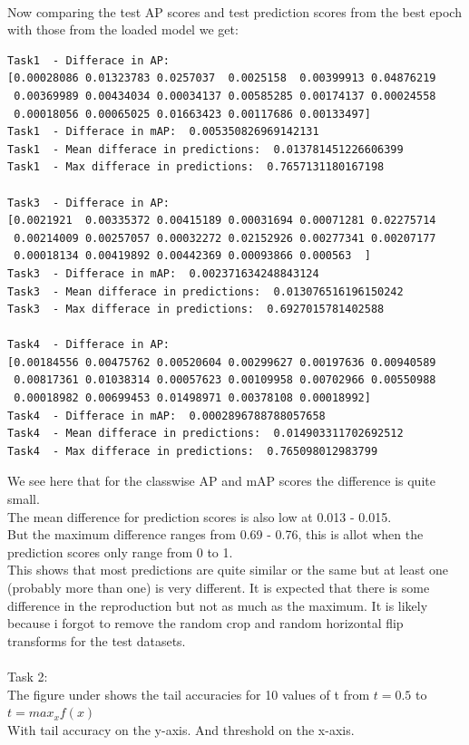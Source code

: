 \documentclass[12pt, letterpaper, twoside]{article}
\begin{document}
\newpage
\ \\
Now comparing the test AP scores and test prediction scores from the best epoch with those from the loaded model we get:\\
\begin{verbatim}
Task1  - Differace in AP:  
[0.00028086 0.01323783 0.0257037  0.0025158  0.00399913 0.04876219
 0.00369989 0.00434034 0.00034137 0.00585285 0.00174137 0.00024558
 0.00018056 0.00065025 0.01663423 0.00117686 0.00133497]
Task1  - Differace in mAP:  0.005350826969142131
Task1  - Mean differace in predictions:  0.013781451226606399
Task1  - Max differace in predictions:  0.7657131180167198

Task3  - Differace in AP:  
[0.0021921  0.00335372 0.00415189 0.00031694 0.00071281 0.02275714
 0.00214009 0.00257057 0.00032272 0.02152926 0.00277341 0.00207177
 0.00018134 0.00419892 0.00442369 0.00093866 0.000563  ]
Task3  - Differace in mAP:  0.002371634248843124
Task3  - Mean differace in predictions:  0.013076516196150242
Task3  - Max differace in predictions:  0.6927015781402588

Task4  - Differace in AP:  
[0.00184556 0.00475762 0.00520604 0.00299627 0.00197636 0.00940589
 0.00817361 0.01038314 0.00057623 0.00109958 0.00702966 0.00550988
 0.00018982 0.00699453 0.01498971 0.00378108 0.00018992]
Task4  - Differace in mAP:  0.0002896788788057658
Task4  - Mean differace in predictions:  0.014903311702692512
Task4  - Max differace in predictions:  0.765098012983799
\end{verbatim}
We see here that for the classwise AP and mAP scores the difference is quite small.\\
The mean difference for prediction scores is also low at 0.013 - 0.015.\\
But the maximum difference ranges from 0.69 - 0.76, this is allot when the prediction scores only range from 0 to 1.\\
This shows that most predictions are quite similar or the same but at least one (probably more than one) is very different. It is expected that there is some difference in the reproduction but not as much as the maximum. It is likely because i forgot to remove the random crop and random horizontal flip transforms for the test datasets.\\ 
\newpage
\ \\
Task 2:\\
The figure under shows the tail accuracies for 10 values of t from $t=0.5$ to $t=max_x f(x)$\\
With tail accuracy on the y-axis. And threshold on the x-axis.\\
\end{document}
